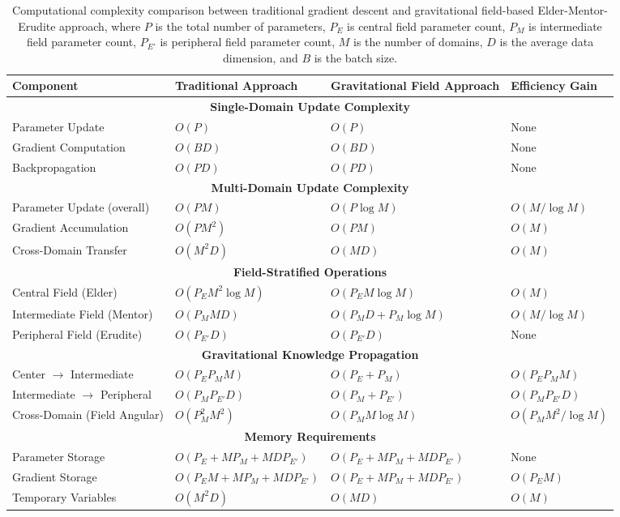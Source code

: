 \begin{table}[h]
\centering
\begin{tabular}{|p{3cm}|p{4.5cm}|p{4.5cm}|p{3cm}|}
\hline
\textbf{Component} & \textbf{Traditional Approach} & \textbf{Gravitational Field Approach} & \textbf{Efficiency Gain} \\
\hline
\multicolumn{4}{|c|}{\textbf{Single-Domain Update Complexity}} \\
\hline
Parameter Update & $O(P)$ & $O(P)$ & None \\
\hline
Gradient Computation & $O(BD)$ & $O(BD)$ & None \\
\hline
Backpropagation & $O(PD)$ & $O(PD)$ & None \\
\hline
\multicolumn{4}{|c|}{\textbf{Multi-Domain Update Complexity}} \\
\hline
Parameter Update (overall) & $O(PM)$ & $O(P \log M)$ & $O(M/\log M)$ \\
\hline
Gradient Accumulation & $O(PM^2)$ & $O(PM)$ & $O(M)$ \\
\hline
Cross-Domain Transfer & $O(M^2D)$ & $O(MD)$ & $O(M)$ \\
\hline
\multicolumn{4}{|c|}{\textbf{Field-Stratified Operations}} \\
\hline
Central Field (Elder) & $O(P_E M^2 \log M)$ & $O(P_E M \log M)$ & $O(M)$ \\
\hline
Intermediate Field (Mentor) & $O(P_M M D)$ & $O(P_M D + P_M \log M)$ & $O(M/\log M)$ \\
\hline
Peripheral Field (Erudite) & $O(P_{E'} D)$ & $O(P_{E'} D)$ & None \\
\hline
\multicolumn{4}{|c|}{\textbf{Gravitational Knowledge Propagation}} \\
\hline
Center $\to$ Intermediate & $O(P_E P_M M)$ & $O(P_E + P_M)$ & $O(P_E P_M M)$ \\
\hline
Intermediate $\to$ Peripheral & $O(P_M P_{E'} D)$ & $O(P_M + P_{E'})$ & $O(P_M P_{E'} D)$ \\
\hline
Cross-Domain (Field Angular) & $O(P_M^2 M^2)$ & $O(P_M M \log M)$ & $O(P_M M^2/\log M)$ \\
\hline
\multicolumn{4}{|c|}{\textbf{Memory Requirements}} \\
\hline
Parameter Storage & $O(P_E + MP_M + MD P_{E'})$ & $O(P_E + MP_M + MD P_{E'})$ & None \\
\hline
Gradient Storage & $O(P_E M + MP_M + MD P_{E'})$ & $O(P_E + MP_M + MD P_{E'})$ & $O(P_E M)$ \\
\hline
Temporary Variables & $O(M^2D)$ & $O(MD)$ & $O(M)$ \\
\hline
\end{tabular}
\caption{Computational complexity comparison between traditional gradient descent and gravitational field-based Elder-Mentor-Erudite approach, where $P$ is the total number of parameters, $P_E$ is central field parameter count, $P_M$ is intermediate field parameter count, $P_{E'}$ is peripheral field parameter count, $M$ is the number of domains, $D$ is the average data dimension, and $B$ is the batch size.}
\label{tab:complexity_comparison}
\end{table}

